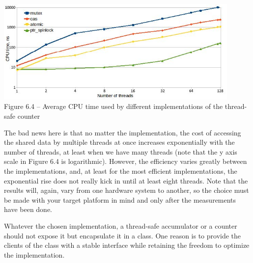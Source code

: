 \begin{center}
\includegraphics[width=0.9\textwidth]{content/2/chapter6/images/4.jpg}\\
Figure 6.4 – Average CPU time used by different implementations of the thread-safe counter
\end{center}

The bad news here is that no matter the implementation, the cost of accessing the shared data by multiple threads at once increases exponentially with the number of threads, at least when we have many threads (note that the y axis scale in Figure 6.4 is logarithmic). However, the efficiency varies greatly between the implementations, and, at least for the most efficient implementations, the exponential rise does not really kick in until at least eight threads. Note that the results will, again, vary from one hardware system to another, so the choice must be made with your target platform in mind and only after the measurements have been done.

Whatever the chosen implementation, a thread-safe accumulator or a counter should not expose it but encapsulate it in a class. One reason is to provide the clients of the class with a stable interface while retaining the freedom to optimize the implementation.

